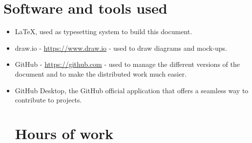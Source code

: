 \section{Software and tools used}
\begin{itemize}
    \item \LaTeX, used as typesetting system to build this document.
    \item draw.io - \url{https://www.draw.io} - used to draw diagrams and mock-ups.
    \item GitHub - \url{https://github.com} - used to manage the different versions of the document and to make the distributed work much easier.
    \item GitHub Desktop, the GitHub official application that offers a seamless way to contribute to projects.

\section{Hours of work}

\end{itemize}
